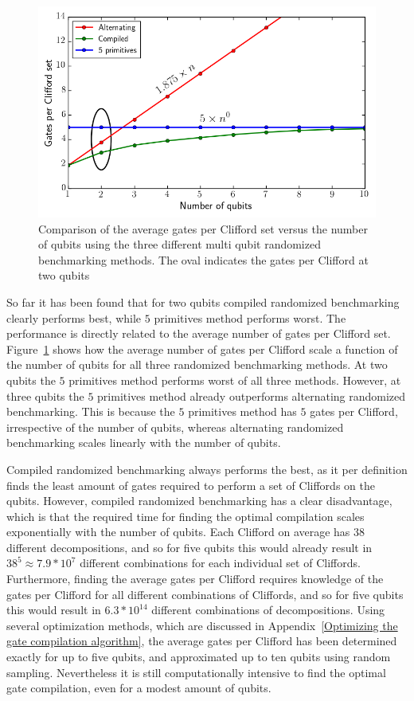           \begin{figure}[tb]
            \centering
            \includegraphics[width=.8\textwidth]{../Figures/Randomized benchmarking/Clifford_comparison.png}
            \caption{Comparison of the average gates per Clifford set versus the number of qubits using the three different multi qubit randomized benchmarking methods. The oval indicates the gates per Clifford at two qubits}
            \label{fig:gate per Clifford versus qubits comparison}
          \end{figure}

          So far it has been found that for two qubits compiled randomized benchmarking clearly performs best, while $5$ primitives method performs worst. The performance is directly related to the average number of gates per Clifford set. Figure~\ref{fig:gate per Clifford versus qubits comparison} shows how the average number of gates per Clifford scale a function of the number of qubits for all three randomized benchmarking methods. At two qubits the $5$ primitives method performs worst of all three methods. However, at three qubits the $5$ primitives method already outperforms alternating randomized benchmarking. This is because the $5$ primitives method has $5$ gates per Clifford, irrespective of the number of qubits, whereas alternating randomized benchmarking scales linearly with the number of qubits.

          Compiled randomized benchmarking always performs the best, as it per definition finds the least amount of gates required to perform a set of Cliffords on the qubits. However, compiled randomized benchmarking has a clear disadvantage, which is that the required time for finding the optimal compilation scales exponentially with the number of qubits. Each Clifford on average has $38$ different decompositions, and so for five qubits this would already result in $38^5\approx 7.9 * 10^{7}$ different combinations for each individual set of Cliffords. Furthermore, finding the average gates per Clifford requires knowledge of the gates per Clifford for all different combinations of Cliffords, and so for five qubits this would result in $6.3*10^{14}$ different combinations of decompositions. Using several optimization methods, which are discussed in Appendix~\ref{Optimizing the gate compilation algorithm}, the average gates per Clifford has been determined exactly for up to five qubits, and approximated up to ten qubits using random sampling. Nevertheless it is still computationally intensive to find the optimal gate compilation, even for a modest amount of qubits.


